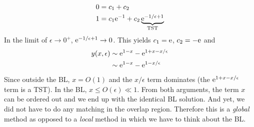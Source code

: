 \begin{align*}
	0 &= c_1 + c_2 \\
	1 &= c_1 \mathrm{e}^{-1} + c_2 \underbrace{\mathrm{e}^{-1/\epsilon + 1}}_\text{TST} 
\end{align*}
In the limit of $\epsilon \rightarrow 0^+$, $\mathrm{e}^{-1/\epsilon+1} \rightarrow 0$. This yields $c_1 = \mathrm{e}$, $c_2 = -\mathrm{e}$ and
\begin{align*}
	y(x,\epsilon) &\sim \mathrm{e}^{1-x} - \mathrm{e}^{1+x-x/\epsilon} \\
	& \sim \mathrm{e}^{1-x} - \mathrm{e}^{1-x/\epsilon} 
\end{align*}
Since outside the BL, $x=O(1)$ and the $x/\epsilon$ term dominates (the $\mathrm{e}^{1+x-x/\epsilon}$ term is a TST). In the BL, $x \leq O(\epsilon) \ll 1 $. From both arguments, the term $x$ can be ordered out and we end up with the identical BL solution. And yet, we did not have to do any matching in the overlap region. Therefore this is a \emph{global} method as opposed to a \emph{local} method in which we have to think about the BL.

